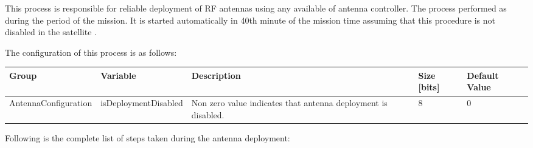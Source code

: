 
This process is responsible for reliable deployment of RF antennas using any available of antenna controller.
The process performed as during the  period of the mission. It is started automatically in 40th 
minute of the mission time assuming that this procedure is not disabled in the satellite .

The configuration of this process is as follows:

\begin{longtable}{l|l|m{6cm}|M{1cm}|M{1.5cm}}
    \toprule
    \textbf{Group} & \textbf{Variable} & \textbf{Description} & \textbf{Size [bits]} & \textbf{Default Value} \\
    \midrule
    \endhead
    AntennaConfiguration & isDeploymentDisabled & Non zero value indicates that antenna deployment is disabled. & 8 & 0 \\
    \bottomrule
\end{longtable}


Following is the complete list of steps taken during the antenna deployment:


